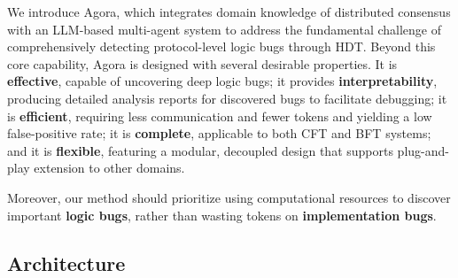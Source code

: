 \documentclass{article}
\theoremstyle{plain}
\theoremstyle{definition}
\theoremstyle{remark}
\newcommand{\consensustester}{Agora\xspace}
\newcommand{\bfagenta}{\textbf{Orchestrator}\xspace}
\newcommand{\bfagentb}{\textbf{Strategy}\xspace}
\newcommand{\bfagentc}{\textbf{TestGen}\xspace}
\begin{document}

We introduce \consensustester, which integrates domain knowledge of distributed consensus with an LLM-based multi-agent system to address the fundamental challenge of comprehensively detecting protocol-level logic bugs through HDT. Beyond this core capability, \consensustester is designed with several desirable properties. It is \textbf{{effective}}, capable of uncovering deep logic bugs; it provides  \textbf{{interpretability}}, producing detailed analysis reports for discovered bugs to facilitate debugging; it is \textbf{{efficient}}, requiring less communication and fewer tokens and yielding a low false-positive rate; it is  \textbf{{complete}}, applicable to both CFT and BFT systems; and it is \textbf{{flexible}}, featuring a modular, decoupled design that supports plug-and-play extension to other domains. 

Moreover, our method should prioritize using computational resources to discover important \textbf{logic bugs}, rather than wasting tokens on \textbf{implementation bugs}.



\subsection{Architecture}




\end{document}
